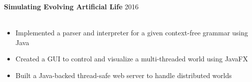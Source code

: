 \documentclass[12pt]{article}
\newcommand{\jobCaption}[2]{
	\hspace{0.3em}
	\fontsize{12}{13} \selectfont
	\textbf{#1}
	\fontsize{11}{12} \selectfont 
	\hfill{#2}\\[.1em]
}
\begin{document}
\jobCaption{Simulating Evolving Artificial Life}{2016}\\[-1.75em]
	\begin{itemize}[leftmargin=1.5cm]
		\setlength\itemsep{-.25em}
		\fontsize{11}{0} \selectfont 
		\item Implemented a parser and interpreter for a given context-free grammar using Java 
		\item Created a GUI to control and visualize a multi-threaded world using JavaFX
		\item Built a Java-backed thread-safe web server to handle distributed worlds
		
	\end{itemize}
	\vspace{.7em}
	
	
	
	\begin{comment}
	\jobCaption{Text Editor}{2016}\\[-1.75em]
	\begin{itemize}[leftmargin=1.5cm]
		\setlength\itemsep{-.25em}
		\fontsize{11}{0} \selectfont 
		
\item Implemented a text editor that had word completion, spell check, and text search functionality
\item Created a trie for text search and autocomplete, built a bloom filter and hashmap for spell check
	
	\end{itemize}
	\vspace{.7em}
	
	\jobCaption{Encryption}{2016}\\[-1.75em]
	\begin{itemize}[leftmargin=1.5cm]
		\setlength\itemsep{-.25em}
		\fontsize{11}{0} \selectfont 
		
	\item Implemented the RSA algorithm and several other ciphers, using the Factory Design Pattern  
\item Used input/output streams to manage memory usage when encrypting and decrypting large files
	\end{itemize}
	\vspace{.7em}
\end{comment}
\end{document}
